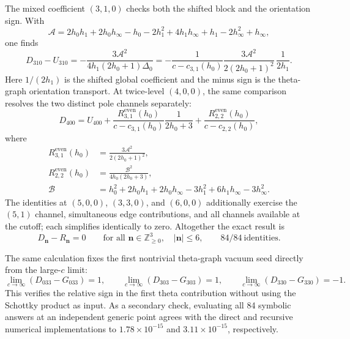 \documentclass[11pt]{article}
\begin{document}
The mixed coefficient \((3,1,0)\) checks both the shifted block and the
orientation sign.  With
\begin{equation}
 \mathcal A=2h_0h_1+2h_0h_\infty-h_0-2h_1^2
 +4h_1h_\infty+h_1-2h_\infty^2+h_\infty,
 \label{eq:symbolic-A-polynomial}
\end{equation}
one finds
\begin{equation}
 D_{310}-U_{310}
 =-\frac{3\mathcal A^2}{4h_1(2h_0+1)\Delta_0}
 =-\frac{1}{c-c_{3,1}(h_0)}
   \frac{3\mathcal A^2}{2(2h_0+1)^2}\,
   \frac{1}{2h_1}.
 \label{eq:symbolic-310-check}
\end{equation}
Here \(1/(2h_1)\) is the shifted global coefficient and the minus sign is
the theta-graph orientation transport.  At twice-level \((4,0,0)\), the
same comparison resolves the two distinct pole channels separately:
\begin{equation}
 D_{400}=U_{400}
 +\frac{R^{\mathrm{even}}_{3,1}(h_0)}
        {c-c_{3,1}(h_0)}\frac{1}{2h_0+3}
 +\frac{R^{\mathrm{even}}_{2,2}(h_0)}
        {c-c_{2,2}(h_0)},
 \label{eq:symbolic-400-check}
\end{equation}
where
\begin{align}
 R^{\mathrm{even}}_{3,1}(h_0)
 &=\frac{3\mathcal A^2}{2(2h_0+1)^2},\nonumber\\
 R^{\mathrm{even}}_{2,2}(h_0)
 &=\frac{\mathcal B^2}{4h_0(2h_0+3)},\nonumber\\
 \mathcal B&=h_0^2+2h_0h_1+2h_0h_\infty
 -3h_1^2+6h_1h_\infty-3h_\infty^2.
 \label{eq:symbolic-even-residues}
\end{align}
The identities at \((5,0,0)\), \((3,3,0)\), and \((6,0,0)\) additionally
exercise the \((5,1)\) channel, simultaneous edge contributions, and all
channels available at the cutoff; each simplifies identically to zero.
Altogether the exact result is
\begin{equation}
 D_{\bm n}-R_{\bm n}=0
 \qquad\text{for all }\bm n\in\mathbb Z_{\geq0}^3,
 \quad |\bm n|\leq6,
 \qquad 84/84\ \text{identities}.
 \label{eq:symbolic-84-result}
\end{equation}

The same calculation fixes the first nontrivial theta-graph vacuum seed
directly from the large-\(c\) limit:
\begin{equation}
 \lim_{c\to\infty}(D_{033}-G_{033})=1,
 \qquad
 \lim_{c\to\infty}(D_{303}-G_{303})=1,
 \qquad
 \lim_{c\to\infty}(D_{330}-G_{330})=-1.
 \label{eq:exact-first-vacuum-seed}
\end{equation}
This verifies the relative sign in the first theta contribution without
using the Schottky product as input.  As a secondary check, evaluating all
84 symbolic answers at an independent generic point agrees with the direct
and recursive numerical implementations to \(1.78\times10^{-15}\) and
\(3.11\times10^{-15}\), respectively.
\end{document}
